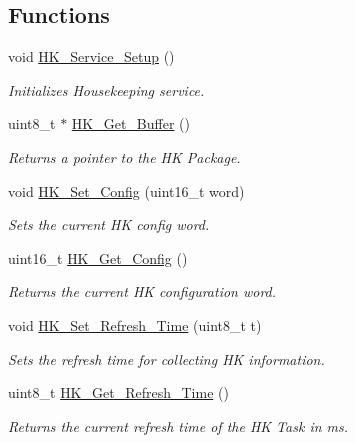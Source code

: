 \subsection*{Functions}
\begin{DoxyCompactItemize}
\item 
void \hyperlink{group___h_k___service_gac59d791680b33dd9ce060d6cd1c8d503}{H\+K\+\_\+\+Service\+\_\+\+Setup} ()
\begin{DoxyCompactList}\small\item\em Initializes Housekeeping service. \end{DoxyCompactList}\item 
uint8\+\_\+t $\ast$ \hyperlink{group___h_k___service_ga18db64c11f8d6334b8e954d70da0045e}{H\+K\+\_\+\+Get\+\_\+\+Buffer} ()
\begin{DoxyCompactList}\small\item\em Returns a pointer to the HK Package. \end{DoxyCompactList}\item 
void \hyperlink{group___h_k___service_ga4df6d95ad8240c83fae869b1cdf25c5e}{H\+K\+\_\+\+Set\+\_\+\+Config} (uint16\+\_\+t word)
\begin{DoxyCompactList}\small\item\em Sets the current HK config word. \end{DoxyCompactList}\item 
uint16\+\_\+t \hyperlink{group___h_k___service_ga8f8a150f9356f9acaa04e0fa6845c665}{H\+K\+\_\+\+Get\+\_\+\+Config} ()
\begin{DoxyCompactList}\small\item\em Returns the current HK configuration word. \end{DoxyCompactList}\item 
void \hyperlink{group___h_k___service_gafc2f4843a1264e16569eed48653b9d5c}{H\+K\+\_\+\+Set\+\_\+\+Refresh\+\_\+\+Time} (uint8\+\_\+t t)
\begin{DoxyCompactList}\small\item\em Sets the refresh time for collecting HK information. \end{DoxyCompactList}\item 
uint8\+\_\+t \hyperlink{group___h_k___service_ga302ac334855fd8caa8f08bdb8ccd14d8}{H\+K\+\_\+\+Get\+\_\+\+Refresh\+\_\+\+Time} ()
\begin{DoxyCompactList}\small\item\em Returns the current refresh time of the HK Task in ms. \end{DoxyCompactList}\end{DoxyCompactItemize}


